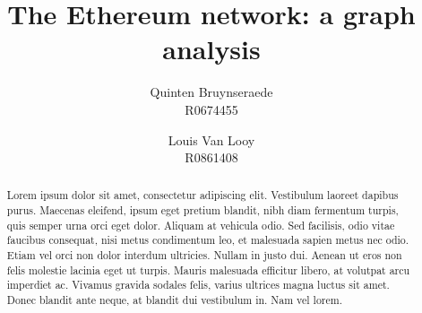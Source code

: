 \documentclass[10pt,a4paper]{article}
\author{Quinten Bruynseraede  \\ R0674455 \and Louis Van Looy \\ R0861408}
\title{The Ethereum network: a graph analysis}
\begin{document}
\maketitle

\begin{abstract}
	Lorem ipsum dolor sit amet, consectetur adipiscing elit. Vestibulum laoreet dapibus purus. Maecenas eleifend, ipsum eget pretium blandit, nibh diam fermentum turpis, quis semper urna orci eget dolor. Aliquam at vehicula odio. Sed facilisis, odio vitae faucibus consequat, nisi metus condimentum leo, et malesuada sapien metus nec odio. Etiam vel orci non dolor interdum ultricies. Nullam in justo dui. Aenean ut eros non felis molestie lacinia eget ut turpis. Mauris malesuada efficitur libero, at volutpat arcu imperdiet ac. Vivamus gravida sodales felis, varius ultrices magna luctus sit amet. Donec blandit ante neque, at blandit dui vestibulum in. Nam vel lorem. 
\end{abstract}
\end{document}
